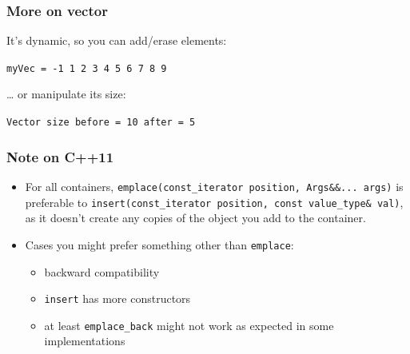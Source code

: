 \subsubsection{More on vector}\label{more-on-vector}

It's dynamic, so you can add/erase elements:

\begin{Shaded}
\begin{Highlighting}[]
 \NormalTok{(} 
\NormalTok{\}}
\NormalTok{);}
\NormalTok{);}
\end{Highlighting}
\end{Shaded}

\texttt{myVec = -1 1 2 3 4 5 6 7 8 9}

\ldots{} or manipulate its size:

\begin{Shaded}
\begin{Highlighting}[]
\NormalTok{);}
 
\NormalTok{);}
 \NormalTok{;}
\end{Highlighting}
\end{Shaded}

\texttt{Vector size before = 10 after = 5}

\subsubsection{Note on C++11}\label{note-on-c11}

\begin{itemize}
\itemsep1pt\parskip0pt
\item
  For all containers,
  \texttt{emplace(const\_iterator position, Args\&\&... args)} is
  preferable to
  \texttt{insert(const\_iterator position, const value\_type\& val)}, as
  it doesn't create any copies of the object you add to the container.
\item
  Cases you might prefer something other than \texttt{emplace}:

  \begin{itemize}
  \itemsep1pt\parskip0pt
  \item
    backward compatibility
  \item
    \texttt{insert} has more constructors
  \item
    at least \texttt{emplace\_back} might not work as expected in some
    implementations
  \end{itemize}
\end{itemize}

